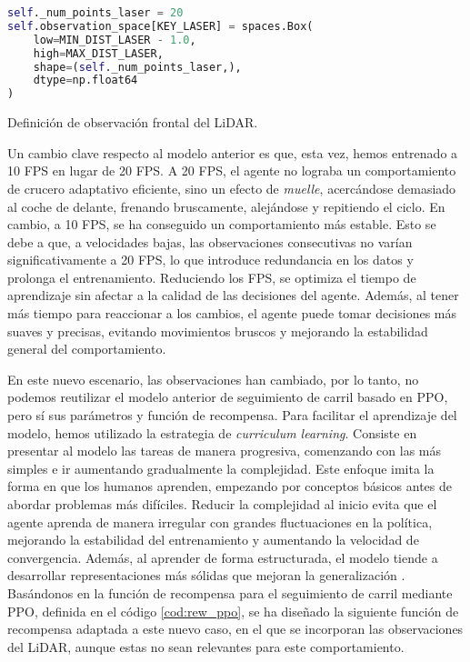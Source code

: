 \begin{code}[h]
\begin{lstlisting}[language=Python]
self._num_points_laser = 20
self.observation_space[KEY_LASER] = spaces.Box(
	low=MIN_DIST_LASER - 1.0,
	high=MAX_DIST_LASER,
	shape=(self._num_points_laser,),
	dtype=np.float64
)
\end{lstlisting}
\caption[Definición de observación frontal del \ac{LiDAR}]{Definición de observación frontal del \ac{LiDAR}.}
\label{cod:obs_laser_front}
\end{code}

Un cambio clave respecto al modelo anterior es que, esta vez, hemos entrenado a 10 \ac{FPS} en lugar de 20 \ac{FPS}. A 20 \ac{FPS}, el agente no lograba un comportamiento de crucero adaptativo eficiente, sino un efecto de \textit{muelle}, acercándose demasiado al coche de delante, frenando bruscamente, alejándose y repitiendo el ciclo. En cambio, a 10 \ac{FPS}, se ha conseguido un comportamiento más estable. Esto se debe a que, a velocidades bajas, las observaciones consecutivas no varían significativamente a 20 \ac{FPS}, lo que introduce redundancia en los datos y prolonga el entrenamiento. Reduciendo los \ac{FPS}, se optimiza el tiempo de aprendizaje sin afectar a la calidad de las decisiones del agente. Además, al tener más tiempo para reaccionar a los cambios, el agente puede tomar decisiones más suaves y precisas, evitando movimientos bruscos y mejorando la estabilidad general del comportamiento.

En este nuevo escenario, las observaciones han cambiado, por lo tanto, no podemos reutilizar el modelo anterior de seguimiento de carril basado en \ac{PPO}, pero sí sus parámetros y función de recompensa. Para facilitar el aprendizaje del modelo, hemos utilizado la estrategia de \textit{curriculum learning}. Consiste en presentar al modelo las tareas de manera progresiva, comenzando con las más simples e ir aumentando gradualmente la complejidad. Este enfoque imita la forma en que los humanos aprenden, empezando por conceptos básicos antes de abordar problemas más difíciles. Reducir la complejidad al inicio evita que el agente aprenda de manera irregular con grandes fluctuaciones en la política, mejorando la estabilidad del entrenamiento y aumentando la velocidad de convergencia. Además, al aprender de forma estructurada, el modelo tiende a desarrollar representaciones más sólidas que mejoran la generalización \cite{curriculum-learning}. Basándonos en la función de recompensa para el seguimiento de carril mediante \ac{PPO}, definida en el código \ref{cod:rew_ppo}, se ha diseñado la siguiente función de recompensa adaptada a este nuevo caso, en el que se incorporan las observaciones del \ac{LiDAR}, aunque estas no sean relevantes para este comportamiento.

